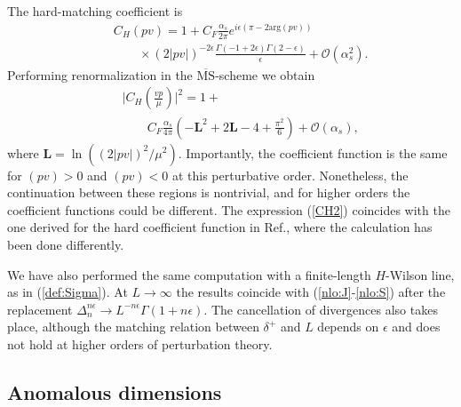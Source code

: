 \documentclass[a4paper, amsfonts, amssymb, amsmath, reprint, showkeys, nofootinbib, twoside]{revtex4-1}
\newcommand{\nn}{\nonumber}
\renewcommand{\(}{\left(}
\renewcommand{\)}{\right)}
\renewcommand{\[}{\left[}
\renewcommand{\]}{\right]}
\begin{document}
The hard-matching coefficient is
\begin{eqnarray}
&&C_H(pv)=1+C_F\frac{\alpha_s}{2\pi}e^{i\epsilon (\pi-2\text{arg}(pv))}
\\\nn&&\qquad \times(2|pv|)^{-2\epsilon}\frac{\Gamma(-1+2\epsilon)\Gamma(2-\epsilon)}{\epsilon}
+\mathcal{O}(\alpha_s^2).
\end{eqnarray}
Performing renormalization in the $\overline{\text{MS}}$-scheme we obtain
\begin{eqnarray}\label{CH2}
&&\Big|C_H\(\frac{vp}{\mu}\)\Big|^2=1+
\\&&\nn\qquad
C_F\frac{\alpha_s}{4\pi}\(-\mathbf{L}^2+2\mathbf{L}-4+\frac{\pi^2}{6}\)+\mathcal{O}(\alpha_s),
\end{eqnarray}
where $\mathbf{L}=\ln((2|pv|)^2/\mu^2)$. Importantly, the coefficient function is the same for $(pv)>0$ and $(pv)<0$ at this perturbative order. Nonetheless, the continuation between these regions is nontrivial, and for higher orders the coefficient functions could be different. The expression (\ref{CH2}) coincides with the one derived for the hard coefficient function in Ref.\cite{Ebert:2018gzl,Ebert:2019okf}, where the calculation has been done differently.

We have also performed the same computation with a finite-length $H$-Wilson line, as in (\ref{def:Sigma}). At $L\to\infty$ the results coincide with (\ref{nlo:J}-\ref{nlo:S}) after the replacement $\Delta_n^{n\epsilon}\to L^{-n\epsilon}\Gamma(1+n\epsilon)$. The cancellation of divergences also takes place, although the matching relation between $\delta^+$ and $L$ depends on $\epsilon$ and does not hold at higher orders of perturbation theory.

\subsection{Anomalous dimensions}
\end{document}
